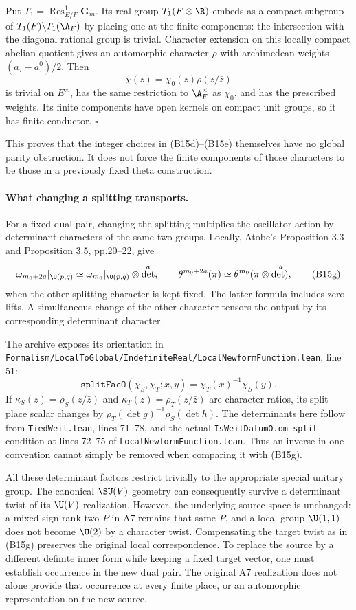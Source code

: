 Put $T_1=\operatorname{Res}^{1}_{E/F}\mathbf G_m$. Its real group $T_1(F\otimes\R)$ embeds as a compact subgroup of $T_1(F)\backslash T_1(\A_F)$ by placing one at the finite components: the intersection with the diagonal rational group is trivial. Character extension on this locally compact abelian quotient gives an automorphic character $\rho$ with archimedean weights $(a_\tau-a^0_\tau)/2$. Then
\[
 \chi(z)=\chi_0(z)\rho(z/\overline z)
\]
is trivial on $E^\times$, has the same restriction to $\A_F^\times$ as $\chi_0$, and has the prescribed weights. Its finite components have open kernels on compact unit groups, so it has finite conductor. \hfill$\square$

This proves that the integer choices in (B15d)--(B15e) themselves have no global parity obstruction. It does not force the finite components of those characters to be those in a previously fixed theta construction.

\paragraph{What changing a splitting transports.}
For a fixed dual pair, changing the splitting multiplies the oscillator action by determinant characters of the same two groups. Locally, Atobe's Proposition 3.3 and Proposition 3.5, pp.20--22, give
\[
 \omega_{m_0+2a}|_{\U(p,q)}
       \simeq\omega_{m_0}|_{\U(p,q)}\otimes\det^a,
 \qquad
 \theta^{m_0+2a}(\pi)
       \simeq\theta^{m_0}(\pi\otimes\det^{-a}),
 \tag{B15g}
\]
when the other splitting character is kept fixed. The latter formula includes zero lifts. A simultaneous change of the other character tensors the output by its corresponding determinant character.

The archive exposes its orientation in
\texttt{Formalism/\allowbreak{}LocalToGlobal/\allowbreak{}IndefiniteReal/\allowbreak{}LocalNewformFunction.lean}, line 51:
\[
 \texttt{splitFacO}(\chi_S,\chi_T;x,y)=\chi_T(x)^{-1}\chi_S(y).
 \tag{B15h}
\]
If $\kappa_S(z)=\rho_S(z/\bar z)$ and $\kappa_T(z)=\rho_T(z/\bar z)$ are character ratios, its split-place scalar changes by
$\rho_T(\det g)^{-1}\rho_S(\det h)$.
The determinants here follow from \texttt{TiedWeil.lean}, lines 71--78, and the actual \texttt{IsWeilDatumO.om\_split} condition at lines 72--75 of \texttt{LocalNewformFunction.lean}. Thus an inverse in one convention cannot simply be removed when comparing it with (B15g).

All these determinant factors restrict trivially to the appropriate special unitary group. The canonical $\SU(V)$ geometry can consequently survive a determinant twist of its $\U(V)$ realization. However, the underlying source space is unchanged: a mixed-sign rank-two $P$ in A7 remains that same $P$, and a local group $\U(1,1)$ does not become $\U(2)$ by a character twist. Compensating the target twist as in (B15g) preserves the original local correspondence. To replace the source by a different definite inner form while keeping a fixed target vector, one must establish occurrence in the new dual pair. The original A7 realization does not alone provide that occurrence at every finite place, or an automorphic representation on the new source.

